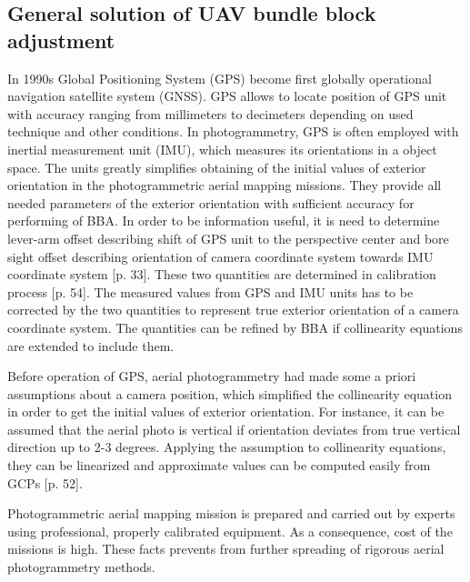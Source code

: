 \documentclass[a4paper,12pt]{article}
\begin{document}
\subsection{General solution of UAV bundle block adjustment}
\label{sec:solution}



In 1990s Global Positioning System (GPS) become first globally operational navigation satellite system (GNSS).
GPS allows 
to locate position of GPS unit with accuracy ranging  from  millimeters to decimeters depending 
on used technique and other conditions. 
In photogrammetry, GPS is often employed with inertial measurement unit (IMU), which measures its orientations in a object space.
The units greatly simplifies obtaining of the initial values of exterior orientation in the photogrammetric aerial mapping missions.
They provide all needed parameters of the exterior orientation with sufficient accuracy for performing of BBA. 
In order to be information useful, it is need to determine 
lever-arm offset describing shift of GPS unit to the perspective center and bore sight offset
describing orientation of camera coordinate system towards IMU coordinate system \cite{perry2009synthesized}[p. 33]. These two
quantities are determined in calibration process \cite{perry2009synthesized}[p. 54]. The measured values from GPS and IMU units has to
be corrected by the two quantities to represent true exterior orientation of a camera coordinate system. The quantities
can be refined by BBA if collinearity equations are extended to include them.

\label{sec:assum}
Before operation of GPS, aerial photogrammetry had made some a priori assumptions about a camera position,
which simplified the collinearity equation in order to get the initial values of exterior orientation. 
For instance, it can be assumed that the aerial photo is vertical if orientation deviates from true vertical
direction up to 2-3 degrees. Applying the assumption to collinearity equations, they can be linearized and 
approximate values can be computed easily from GCPs \cite{pavelka2004foto20}[p. 52].

Photogrammetric aerial mapping mission is prepared and carried out by experts using 
professional, properly calibrated equipment.
As a consequence, cost of the missions
is high. These facts prevents from further spreading of rigorous aerial photogrammetry methods.
\end{document}
